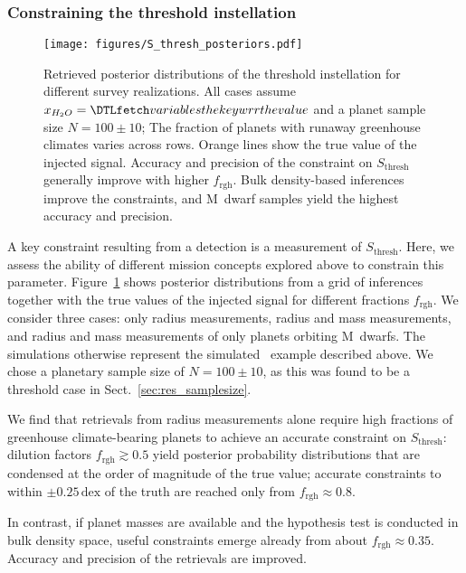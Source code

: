 \documentclass[twocolumn,twocolappendix]{aastex631}
\begin{document}
\subsubsection{Constraining the threshold instellation}\label{sec:res_constrain-S_thresh}
\begin{figure}[ht!]
    \begin{centering}
        \texttt{[image: figures/S\_thresh\_posteriors.pdf]}
        \caption{
            Retrieved posterior distributions of the threshold instellation for different survey realizations.
            All cases assume $x_{H_2O} = \var{wrr}$ and a planet sample size $N=100\pm10$; The fraction of planets with runaway greenhouse climates varies across rows.
            Orange lines show the true value of the injected signal.
            Accuracy and precision of the constraint on $S_\mathrm{thresh}$ generally improve with higher $f_\mathrm{rgh}$.
            Bulk density-based inferences improve the constraints, and M~dwarf samples yield the highest accuracy and precision.
        }
        \label{fig:posterior_surveys}
    \end{centering}
\end{figure}
A key constraint resulting from a detection is a measurement of $S_\mathrm{thresh}$.
Here, we assess the ability of different mission concepts explored above to constrain this parameter.
Figure~\ref{fig:posterior_surveys} shows posterior distributions from a grid of inferences together with the true values of the injected signal for different fractions $f_\mathrm{rgh}$.
We consider three cases: only radius measurements, radius and mass measurements, and radius and mass measurements of only planets orbiting M~dwarfs.
The simulations otherwise represent the simulated \plato\ example described above.
We chose a planetary sample size of $N=100\pm10$, as this was found to be a threshold case in Sect.~\ref{sec:res_samplesize}.

We find that retrievals from radius measurements alone require high fractions of greenhouse climate-bearing planets to achieve an accurate constraint on $S_\mathrm{thresh}$:
dilution factors $f_\mathrm{rgh} \gtrsim 0.5$ yield posterior probability distributions that are condensed at the order of magnitude of the true value; accurate constraints to within $\pm 0.25\,\mathrm{dex}$ of the truth are reached only from $f_\mathrm{rgh} \approx 0.8$.

In contrast, if planet masses are available and the hypothesis test is conducted in bulk density space, useful constraints emerge already from about $f_\mathrm{rgh} \approx 0.35$.
Accuracy and precision of the retrievals are improved.
\end{document}
